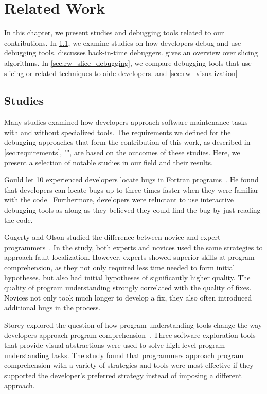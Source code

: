 \chapter{Related Work}

In this chapter, we present studies and debugging tools related to our contributions.
In \cref{sec:rw_studies}, we examine studies on how developers debug and use debugging tools.
 discusses back-in-time debuggers.
 gives an overview over slicing algorithms.
In \cref{sec:rw_slice_debugging}, we compare debugging tools that use slicing or related techniques to aide developers.
 and 
\cref{sec:rw_visualization}


\section{Studies}
\label{sec:rw_studies}

Many studies examined how developers approach software maintenance tasks with and without specialized tools.
The requirements we defined for the debugging approaches that form the contribution of this work, as described in \cref{sec:requirements}, "", are based on the outcomes of these studies.
Here, we present a selection of notable studies in our field and their results.

Gould let 10 experienced developers locate bugs in Fortran programs~\cite{gould75:some_psychological_evidence}.
He found that developers can locate bugs up to three times faster when they were familiar with the code~
Furthermore, developers were reluctant to use interactive debugging tools as along as they believed they could find the bug by just reading the code.

Gugerty and Olson studied the difference between novice and expert programmers~\cite{gugerty86:comprehension_differences_in_debugging}.
In the study, both experts and novices used the same strategies to approach fault localization.
However, experts showed superior skills at program comprehension, as they not only required less time needed to form initial hypotheses, but also had initial hypotheses of significantly higher quality.
The quality of program understanding strongly correlated with the quality of fixes.
Novices not only took much longer to develop a fix, they also often introduced additional bugs in the process.

Storey \etal explored the question of how program understanding tools change the way developers approach program comprehension~\cite{storey97:how_do_program_understanding}.
Three software exploration tools that provide visual abstractions were used to solve high-level program understanding tasks.
The study found that programmers approach program comprehension with a variety of strategies and tools were most effective if they supported the developer's preferred strategy instead of imposing a different approach.

